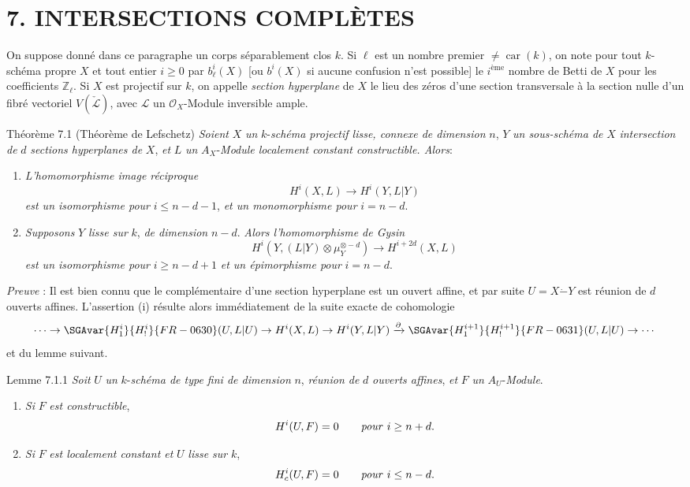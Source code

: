 \section*{7. INTERSECTIONS COMPLÈTES}

On suppose donné dans ce paragraphe un corps séparablement clos $k$. Si $\ell$ est un nombre premier $\ne\operatorname{car}(k)$, on note pour tout $k$-schéma propre $X$ et tout entier $i\ge0$ par
$b_\ell^i(X)$ [ou $b^i(X)$ si aucune confusion n'est possible] le $i^{\text{ème}}$ nombre de Betti de $X$ pour les coefficients $\mathbb{Z}_\ell$. Si $X$ est projectif sur $k$, on appelle \emph{section hyperplane} de $X$ le lieu des zéros d'une section transversale à la section nulle d'un fibré vectoriel $V(\check{\mathcal{L}})$, avec $\mathcal{L}$ un $\mathcal{O}_X$-Module inversible ample.

\begin{statement}{Théorème 7.1}
(Théorème de Lefschetz) \emph{Soient} $X$ \emph{un} $k$-\emph{schéma projectif lisse, connexe de dimension} $n$, $Y$ \emph{un sous-schéma de} $X$ \emph{intersection de} $d$ \emph{sections hyperplanes de} $X$, \emph{et} $L$ \emph{un} $A_X$-\emph{Module localement constant constructible. Alors}:
\begin{enumerate}[label=(\roman*)]
\item \emph{L'homomorphisme image réciproque}
\[
H^i(X,L)\to H^i(Y,L|Y)
\]
\emph{est un isomorphisme pour} $i\le n-d-1$, \emph{et un monomorphisme pour} $i=n-d$.
\item \emph{Supposons} $Y$ \emph{lisse sur} $k$, \emph{de dimension} $n-d$. \emph{Alors l'homomorphisme de Gysin}
\[
H^i(Y,(L|Y)\otimes\mu_Y^{\otimes -d})\to H^{i+2d}(X,L)
\]
\emph{est un isomorphisme pour} $i\ge n-d+1$ \emph{et un épimorphisme pour} $i=n-d$.
\end{enumerate}
\end{statement}

\emph{Preuve} : Il est bien connu que le complémentaire d'une section hyperplane est un ouvert affine, et par suite $U=X\mathbin{\dot{-}}Y$ est réunion de $d$ ouverts affines. L'assertion (i) résulte alors immédiatement de la suite exacte de cohomologie
\[
\cdots\to \SGAvar{H_1^i}{H_!^i}{FR-0630}(U,L|U)\to H^i(X,L)\to H^i(Y,L|Y)
\xrightarrow{\partial} \SGAvar{H_1^{i+1}}{H_!^{i+1}}{FR-0631}(U,L|U)\to\cdots
\]
et du lemme suivant.

\begin{statement}{Lemme 7.1.1}
\emph{Soit} $U$ \emph{un} $k$-\emph{schéma de type fini de dimension} $n$, \emph{réunion de} $d$ \emph{ouverts affines}, \emph{et} $F$ \emph{un} $A_U$-\emph{Module}.
\begin{enumerate}[label=\alph*)]
\item \emph{Si} $F$ \emph{est constructible},
\[
H^i(U,F)=0\qquad\text{\emph{pour} }i\ge n+d.
\]
\item \emph{Si} $F$ \emph{est localement constant et} $U$ \emph{lisse sur} $k$,
\[
H^i_c(U,F)=0\qquad\text{\emph{pour} }i\le n-d.
\]
\end{enumerate}
\end{statement}

